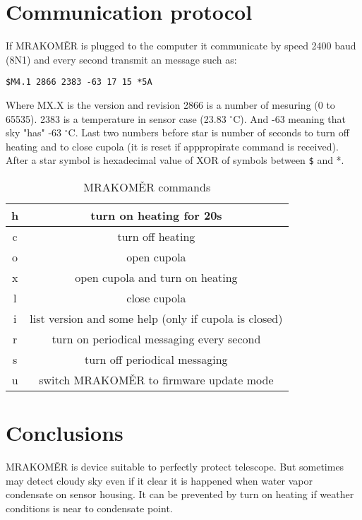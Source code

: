 \documentclass[10pt,a4paper]{article}
\begin{document}
\section{Communication protocol}
If MRAKOMĚR is plugged to the computer it communicate by speed 2400 baud (8N1) and every second transmit an message such as: 

\begin{verbatim}
$M4.1 2866 2383 -63 17 15 *5A
\end{verbatim}

Where MX.X is the version and revision 2866 is a number of mesuring (0 to 65535). 2383 is a temperature in sensor case (23.83 $^\circ$C). And -63 meaning that sky "has" -63 $^\circ$C. Last two numbers before star is number of seconds to turn off heating and to close cupola (it is reset if apppropirate command is received). After a star symbol is hexadecimal value of XOR of symbols between \verb+$+ and *.

\begin{table}[htbp]
\begin{center}
\begin{tabular}{|c|c|}
\hline  h & turn on heating for 20s \\ 
\hline  c & turn off heating  \\ 
\hline  o & open cupola \\ 
\hline  x & open cupola and turn on heating \\ 
\hline  l & close cupola \\ 
\hline  i & list version and some help (only if cupola is closed)  \\ 
\hline  r & turn on periodical messaging every second \\ 
\hline  s & turn off periodical messaging \\ 
\hline  u & switch MRAKOMĚR to firmware update mode \\ 
\hline 
\end{tabular}
\caption{MRAKOMĚR commands}
\end{center}

\end{table}

\section{Conclusions}
MRAKOMĚR is device suitable to perfectly protect telescope. But sometimes may detect cloudy sky even if it clear it is happened when water vapor condensate on sensor housing. It can be prevented by turn on heating if weather conditions is near to condensate point. 
\end{document}
